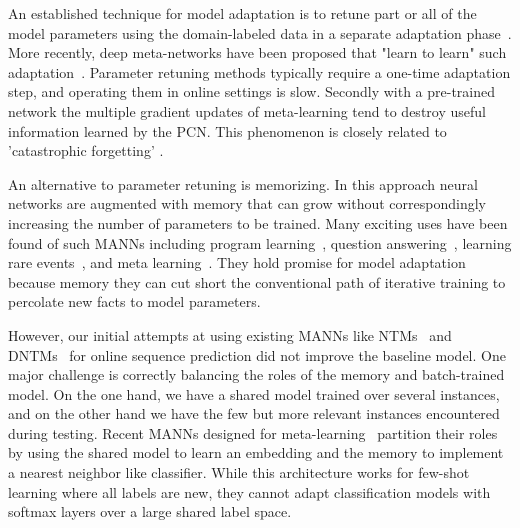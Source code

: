\documentclass[letterpaper]{article} %
\def\shiv#1{\todo [color=orange]{Shiv: #1}}
\begin{document}
An established technique for model adaptation is to retune part or all of the model parameters using the domain-labeled data in a separate adaptation phase~\cite{daume2007}.  More recently, deep meta-networks have been proposed that "learn to learn" such adaptation~\cite{Rei15,Finn2017ModelAgnosticMF,Huang2015MaximumAP,ravi17}. Parameter retuning methods typically require a one-time adaptation step, and operating them in online settings is slow.
Secondly with a pre-trained network the multiple gradient updates of meta-learning tend to destroy useful information learned by the PCN. This phenomenon is closely related to 'catastrophic forgetting'  \cite{French99,KirkpatrickPRVD16}. 

An alternative to parameter retuning is memorizing.  In this approach neural networks are augmented  with memory that can grow without correspondingly increasing the number of parameters to be trained.  Many exciting uses have been found of such MANNs including program learning~\cite{GravesNTM}, question answering~\cite{Weston16,GulcehreCCB16}, learning rare events~\cite{kaiser2017}, and meta learning~\cite{SantoroBBWL16}.  They hold promise for model adaptation because memory they can cut short the conventional path of iterative training to percolate new facts to model parameters.  



However, our initial attempts at using existing MANNs like NTMs~\cite{GravesNTM} and DNTMs~\cite{GulcehreCCB16} for online sequence prediction did not improve the baseline model. One major challenge is correctly balancing the roles of the memory and batch-trained model.   On the one hand, we have a shared model trained over several instances, and on the other hand we have the few but more relevant instances encountered during testing. Recent MANNs designed for meta-learning~\cite{SantoroBBWL16} partition their roles by using the shared model to learn an embedding and the memory to implement a nearest neighbor like classifier. While this architecture works for few-shot learning where all labels are new, they cannot adapt classification models with softmax layers over a large shared label space.
\end{document}
